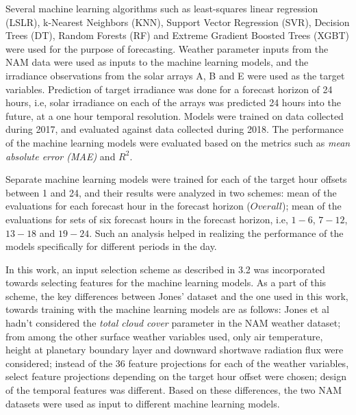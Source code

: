 \par Several machine learning algorithms such as least-squares linear regression (LSLR), k-Nearest Neighbors (KNN), Support Vector Regression (SVR), Decision Trees (DT), Random Forests (RF) and Extreme Gradient Boosted Trees (XGBT) were used for the purpose of forecasting. Weather parameter inputs from the NAM data were used as inputs to the machine learning models, and the irradiance observations from the solar arrays A, B and E were used as the target variables. Prediction of target irradiance was done for a forecast horizon of 24 hours, i.e, solar irradiance on each of the arrays was predicted 24 hours into the future, at a one hour temporal resolution. Models were trained on data collected during 2017, and evaluated against data collected during 2018. The performance of the machine learning models were evaluated based on the metrics such as \textit{mean absolute error (MAE)} and $R^2$.  

\par Separate machine learning models were trained for each of the target hour offsets between 1 and 24, and their results were analyzed in two schemes: mean of the evaluations for each forecast hour in the forecast horizon ($Overall$); mean of the evaluations for sets of six forecast hours in the forecast horizon, i.e, $1 - 6$, $7 - 12$, $13 - 18$ and $19 - 24$. Such an analysis helped in realizing the performance of the models specifically for different periods in the day. 

\par In this work, an input selection scheme as described in 3.2 was incorporated towards selecting features for the machine learning models. As a part of this scheme, the key differences between Jones' dataset and the one used in this work, towards training with the machine learning models are as follows: Jones et al hadn't considered the \textit{total cloud cover} parameter in the NAM weather dataset; from among the other surface weather variables used, only air temperature, height at planetary boundary layer and downward shortwave radiation flux were considered; instead of the 36 feature projections for each of the weather variables, select feature projections depending on the target hour offset were chosen; design of the temporal features was different. Based on these differences, the two NAM datasets were used as input to different machine learning models.


